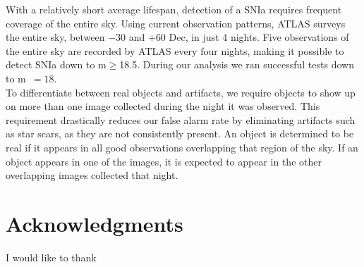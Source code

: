\documentclass[aps,prb,twocolumn,superscriptaddress]{revtex4-1}
\begin{document}
\indent With a relatively short average lifespan, detection of a SNIa requires 
frequent coverage of the entire sky. Using current observation patterns,
ATLAS surveys the entire sky, between $-30$ and $+60$ Dec, in just 4 nights. 
Five observations of the entire sky are recorded by ATLAS every four nights, 
making it possible to detect SNIa down to m$\geq$18.5.  During our analysis 
we ran successful tests down to m~$=18$.\\
\indent To differentiate between real objects 
and artifacts, we require %
objects to show up on 
more than one image collected during the night it was observed.  
This requirement drastically reduces our false alarm rate by 
eliminating artifacts such as star scars, as they 
are not consistently present.  
An object is determined to be real if it appears in all good 
observations overlapping that region of the sky.  
If an object appears in one of the images, it is expected to appear 
in the other overlapping images collected that night.\\





\section*{Acknowledgments}
I would like to thank   %
\end{document}
